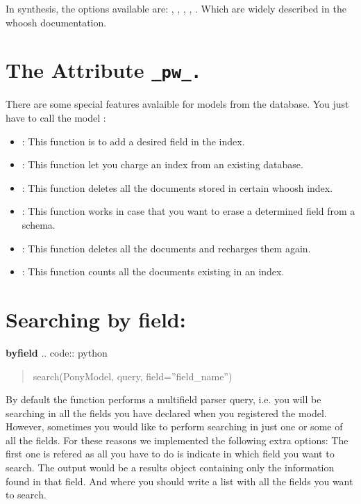 \documentclass[letterpaper,10pt,english]{sphinxmanual}
\begin{document}
In synthesis, the options available are: , , , , . Which are widely described in the whoosh documentation.


\section{The Attribute \texttt{\_pw\_.}}
\label{Introduction:the-attribute-pw}
There are some special features avalaible for models from the database. You just have to call the model :
\begin{itemize}
\item {} 
: This function is to add a desired field in the index.

\item {} 
: This function let you charge an index from an  existing database.

\item {} 
: This function deletes all the documents stored in certain whoosh index.

\item {} 
: This function works in case that you want to erase a determined field from a schema.

\item {} 
: This function deletes all the documents and recharges them again.

\item {} 
: This function counts all the documents existing in an index.

\end{itemize}


\section{Searching by field:}
\label{Introduction:searching-by-field}
{\color{red}\bfseries{}\textbar{}byfield\textbar{}}
.. code:: python
\begin{quote}

search(PonyModel, query, field=''field\_name'')
\end{quote}

By default the function  performs a multifield parser query, i.e.  you will be searching in all the fields you have declared when you registered the model. However, sometimes you would like to perform searching in just one or some of all the fields.
For these reasons we implemented the following extra options: The first one is refered as  all you have to do is indicate in which field you want to search. The output would be a results object containing only the information found in that field. And  where you should write a list with all the fields you want to search.
\end{document}
